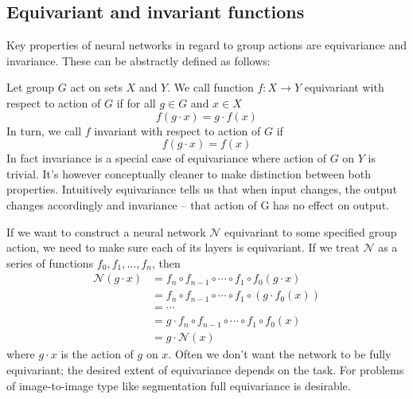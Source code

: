 \subsection{Equivariant and invariant functions}
    \label{sec:theoretical_equiinv}
    \hspace{0.5cm}
     Key properties of neural networks in regard to group actions are equivariance and invariance.
        These can be abstractly defined as follows: \par
        Let group $G$ act on sets $X$ and $Y$. We call function $f: X \rightarrow Y$ equivariant
        with respect to action of $G$ if for all $g \in G$ and $x \in X$
        \begin{equation}
            f(g \cdot x) = g \cdot f(x)
        \end{equation}
        In turn, we call $f$ invariant with respect to action of $G$ if
        \begin{equation}
            f(g \cdot x) = f(x)
        \end{equation}
        In fact invariance is a special case of equivariance where action of $G$ on $Y$ is trivial.
        It's however conceptually cleaner to make distinction between both properties.
        Intuitively equivariance tells us that when input changes, the output changes accordingly
        and invariance -- that action of G has no effect on output.\par
            If we want to construct a neural network $\mathcal{N}$ equivariant to some
        specified group action, we need to make sure each of its layers is equivariant.
        If we treat $\mathcal{N}$ as a series of functions $f_0,f_1,...,f_n$, then
        \begin{align*}
            \mathcal{N}(g \cdot x) &=
            f_n \circ f_{n-1} \circ \cdots \circ f_1 \circ f_0(g\cdot x)  \\
            &= f_n \circ f_{n-1} \circ \cdots \circ f_1 \circ \left( g \cdot f_0(x) \right) \\
            &= \cdots \\
            &= g \cdot f_n \circ f_{n-1} \circ \cdots \circ f_1 \circ f_0(x) \\
            &= g \cdot \mathcal{N}(x)
        \end{align*}
        where $g\cdot x$ is the action of $g$ on $x$. Often we don't want the network
        to be fully equivariant; the desired extent of equivariance depends on the task.
        For problems of image-to-image type like segmentation full equivariance is desirable.
